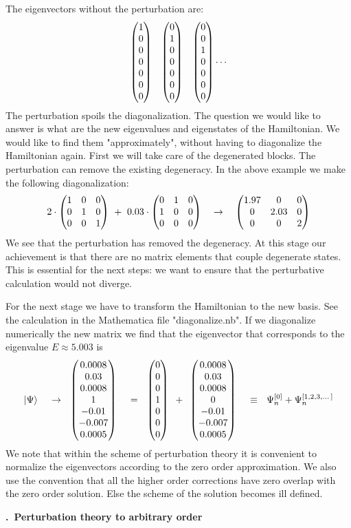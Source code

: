 \documentclass[onecolumn,fleqn, 11pt]{revtex4}
\newcommand{\amatrix}[1]{\begin{matrix} #1 \end{matrix}}
\newcommand{\beq}{\begin{eqnarray}}
\newcommand{\eeq}{\end{eqnarray}}
\renewcommand{\thesubsection}{\arabic{subsection}}
\renewcommand{\thesubsubsection}{\arabic{subsubsection}}
\newcommand{\sheadC}[1]
{
\addtocounter{subsubsection}{1}
\vspace{5mm}
{\bf \thesubsection.\thesubsubsection \ #1}  
\nopagebreak
\phantomsection
}
\begin{document}
The eigenvectors without the perturbation are:
\beq
\left(\amatrix{ 1 \cr 0 \cr 0 \cr 0 \cr 0 \cr 0 \cr 0} \right)\,\,\,\,\, 
\left(\amatrix{ 0 \cr 1 \cr 0 \cr 0 \cr 0 \cr 0 \cr 0} \right) \,\,\,\,\, 
\left(\amatrix{ 0 \cr 0 \cr 1 \cr 0 \cr 0 \cr 0 \cr 0} \right) \cdots 
\eeq
The perturbation spoils the diagonalization. The question we 
would like to answer is what are the new eigenvalues and 
eigenstates of the Hamiltonian. We would like to find them "approximately", 
without having to diagonalize the Hamiltonian again. First 
we will take care of the degenerated blocks. The perturbation 
can remove the existing degeneracy. In the above example we 
make the following diagonalization:
\beq
2 \cdot 
\left(
\amatrix{ 
1 & 0 & 0 \cr 
0 & 1 & 0 \cr 
0 & 0 & 1 } 
\right) 
\,\,+ \,\, 
0.03 \cdot 
\left(
\amatrix{ 
0 & 1 & 0 \cr
1 & 0 & 0 \cr 
0 & 0 & 0 } 
\right) 
\ \ \ \rightarrow \ \ \ 
\left(
\amatrix{ 
1.97 & 0 & 0 \cr 
0 & 2.03 & 0 \cr 
0 & 0 & 2 } 
\right)
\eeq
We see that the perturbation 
has removed the degeneracy. 
At this stage our achievement is that there 
are no matrix elements that couple degenerate states. 
This is essential for the next steps:  
we want to ensure that the perturbative calculation 
would not diverge. 

For the next stage we have to transform the Hamiltonian 
to the new basis. See the calculation in the Mathematica 
file "diagonalize.nb". If we diagonalize numerically 
the new matrix we find that the eigenvector that 
corresponds to the eigenvalue $E \approx 5.003$ is 
\beq
|\Psi\rangle  
\,\,\,\,\,\,\,\rightarrow\,\,\,\, 
\left(\amatrix{ 0.0008 \cr 0.03 \cr 0.0008 \cr 1 \cr -0.01 \cr -0.007 \cr 0.0005 } \right) 
\,\,\,\,\,\,\,= \,\,\,\, 
\left(\amatrix{ 0 \cr 0 \cr 0 \cr 1 \cr 0 \cr 0 \cr 0 } \right) 
\,\,\,+ \,\,\, 
\left(\amatrix{ 0.0008 \cr 0.03 \cr 0.0008 \cr 0 \cr -0.01 \cr -0.007 \cr 0.0005 } \right) 
\,\,\,\,\,\,\, \equiv \,\,\,\, 
\Psi_n^{[0]}+ \Psi_n^{[1,2,3, \dots ]} 
\eeq
We note that within the scheme of perturbation theory  
it is convenient to normalize the eigenvectors according 
to the zero order approximation. We also use the convention 
that all the higher order corrections have zero overlap 
with the zero order solution. Else the scheme of 
the solution becomes ill defined.        



\sheadC{Perturbation theory to arbitrary order} 
\end{document}
